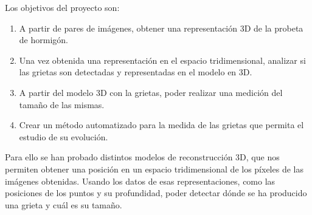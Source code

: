 
Los objetivos del proyecto son:

\begin{enumerate}
	\item A partir de pares de imágenes, obtener una representación 3D de la probeta de hormigón.
	\item Una vez obtenida una representación en el espacio tridimensional, analizar si las grietas son detectadas y representadas en el modelo en 3D.
	\item A partir del modelo 3D con la grietas, poder realizar una medición del tamaño de las mismas.
	\item Crear un método automatizado para la medida de las grietas que permita el estudio de su evolución.
\end{enumerate}

Para ello se han probado distintos modelos de reconstrucción 3D, que nos permiten obtener una posición en un espacio tridimensional de los píxeles de las imágenes obtenidas. Usando los datos de esas representaciones, como las posiciones de los puntos y su profundidad, poder detectar dónde se ha producido una grieta y cuál es su tamaño.